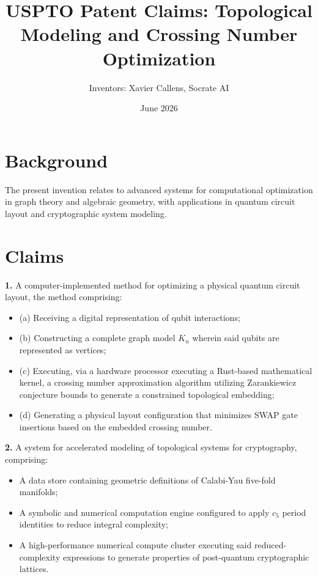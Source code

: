 \documentclass[12pt]{article}
\title{USPTO Patent Claims: Topological Modeling and Crossing Number Optimization}
\author{Inventors: Xavier Callens, Socrate AI}
\date{June 2026}
\begin{document}
\maketitle

\section*{Background}
The present invention relates to advanced systems for computational optimization in graph theory and algebraic geometry, with applications in quantum circuit layout and cryptographic system modeling.

\section*{Claims}

\textbf{1.} A computer-implemented method for optimizing a physical quantum circuit layout, the method comprising:
\begin{itemize}
    \item (a) Receiving a digital representation of qubit interactions;
    \item (b) Constructing a complete graph model $K_n$ wherein said qubits are represented as vertices;
    \item (c) Executing, via a hardware processor executing a Rust-based mathematical kernel, a crossing number approximation algorithm utilizing Zarankiewicz conjecture bounds to generate a constrained topological embedding;
    \item (d) Generating a physical layout configuration that minimizes SWAP gate insertions based on the embedded crossing number.
\end{itemize}

\textbf{2.} A system for accelerated modeling of topological systems for cryptography, comprising:
\begin{itemize}
    \item A data store containing geometric definitions of Calabi-Yau five-fold manifolds;
    \item A symbolic and numerical computation engine configured to apply $c_5$ period identities to reduce integral complexity;
    \item A high-performance numerical compute cluster executing said reduced-complexity expressions to generate properties of post-quantum cryptographic lattices.
\end{itemize}
\end{document}
